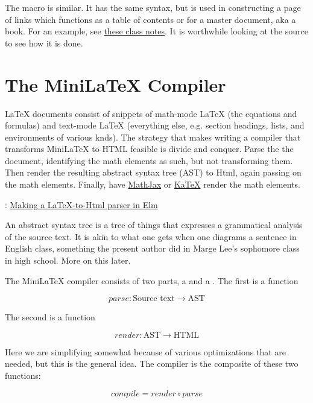 The  macro is similar.  It has the same syntax, but is used in constructing a page of links which functions as a table of contents or  for a master document, aka a book.  For an example, see \href{https://minilatex.lamdera.app/g/34}{these class notes}. It is worthwhile looking at the source to see how it is done.





\section{The MiniLaTeX Compiler}


LaTeX documents consist of snippets of math-mode LaTeX (the equations and formulas) and text-mode LaTeX (everything else, e.g. section headings, lists, and environments of various knds).  The strategy that makes writing a compiler that transforms MiniLaTeX to HTML feasible is divide and conquer.  Parse the the document, identifying the math elements as such, but not transforming them.  Then render the resulting abstract syntax tree (AST) to Html, again passing on the math elements.  Finally, have \href{https://mathjax.org}{MathJax} or \href{https://katex.org}{KaTeX} render the math elements. 

: \href{https://www.youtube.com/watch?v=dmDA7iziSgs&t=15s}{Making a LaTeX-to-Html parser in Elm}

An abstract syntax tree is a tree of things that expresses a grammatical analysis of the source text. It is akin to what one gets when one diagrams a sentence in English class, something the present author did in Marge Lee's sophomore class in high school.  More on this later.


The MiniLaTeX compiler consists of two parts, a  and a .  The first is a function

$$
parse: \text{Source text} \to \text{AST}
$$

The second is a function

$$
render: \text{AST} \to \text{HTML}
$$

Here we are simplifying somewhat because of various optimizations that are needed, but this is the general idea.  The compiler is the composite of these two functions:

$$
compile   = render \circ parse
$$

